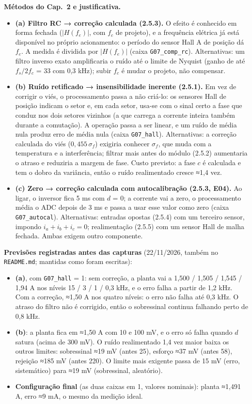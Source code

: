 \documentclass[10pt,a4paper]{article}
\begin{document}
\textbf{Métodos do Cap.~2 e justificativa.}
\begin{itemize}
\item \textbf{(a) Filtro RC → correção calculada (2.5.3).} O efeito é conhecido em forma fechada ($|H(f_e)|$, com $f_c$ de projeto), e a frequência elétrica já está disponível no próprio acionamento: o período do sensor Hall A de posição dá $f_e$. A medida é dividida por $|H(f_e)|$ (caixa \texttt{G07\_comp\_rc}). Alternativas: um filtro inverso exato amplificaria o ruído até o limite de Nyquist (ganho de até $f_s/2f_c$ = 33 com 0,3 kHz); subir $f_c$ é mudar o projeto, não compensar.
\item \textbf{(b) Ruído retificado → insensibilidade inerente (2.5.1).} Em vez de corrigir o viés, o processamento passa a não criá-lo: os sensores Hall de posição indicam o setor e, em cada setor, usa-se com o sinal certo a fase que conduz nos dois setores vizinhos (a que carrega a corrente inteira também durante a comutação). A operação passa a ser linear, e um ruído de média nula produz erro de média nula (caixa \texttt{G07\_hall}). Alternativas: a correção calculada do viés ($0{,}455\,\sigma_f$) exigiria conhecer $\sigma_f$, que muda com a temperatura e a interferência; filtrar mais antes do módulo (2.5.2) aumentaria o atraso e reduziria a margem de fase. Custo previsto: a fase $c$ é calculada e tem o dobro da variância, então o ruído realimentado cresce ≈1,4 vez.
\item \textbf{(c) Zero → correção calculada com autocalibração (2.5.3, E04).} Ao ligar, o inversor fica 5 ms com $d$ = 0; a corrente vai a zero, o processamento média o ADC depois de 3 ms e passa a usar esse valor como zero (caixa \texttt{G07\_autocal}). Alternativas: entradas opostas (2.5.4) com um terceiro sensor, impondo $i_a+i_b+i_c = 0$; realimentação (2.5.5) com um sensor Hall de malha fechada. Ambas exigem outro componente.
\end{itemize}

\textbf{Previsões registradas antes das capturas} (22/11/2026, também no \texttt{README.md}; mantidas como foram escritas):
\begin{itemize}
\item \textbf{(a)}, com \texttt{G07\_hall} = 1: sem correção, a planta vai a 1,500 / 1,505 / 1,545 / 1,94 A nos níveis 15 / 3 / 1 / 0,3 kHz, e o erro falha a partir de 1,2 kHz. Com a correção, ≈1,50 A nos quatro níveis: o erro não falha até 0,3 kHz. O atraso do filtro não é corrigido, então o sobressinal continua falhando perto de 0,8 kHz.
\item \textbf{(b)}: a planta fica em ≈1,50 A com 10 e 100 mV, e o erro só falha quando $d$ satura (acima de 300 mV). O ruído realimentado 1,4 vez maior baixa os outros limites: sobressinal ≈19 mV (antes 25), esforço ≈37 mV (antes 58), rejeição ≈185 mV (antes 220). O limite mais exigente passa de 15 mV (erro, sistemático) para ≈19 mV (sobressinal, aleatório).
\item \textbf{Configuração final} (as duas caixas em 1, valores nominais): planta ≈1,491 A, erro ≈9 mA, o mesmo da medição ideal.
\end{itemize}
\end{document}
